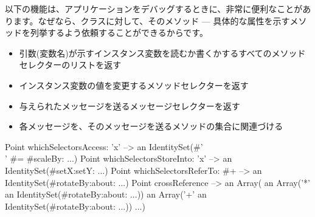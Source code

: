 \documentclass[a4paper,10pt,twoside]{book}
\begin{document}
以下の機能は、アプリケーションをデバッグするときに、非常に便利なことがあります。なぜなら、クラスに対して、そのメソッド --- 具体的な属性を示すメソッドを列挙するよう依頼することができるからです。%
\begin{itemize}
\item {} 引数(変数名)が示すインスタンス変数を読むか書くかするすべてのメソッドセレクターのリストを返す %
\item {} インスタンス変数の値を変更するメソッドセレクターを返す
\item {} 与えられたメッセージを送るメッセージセレクターを返す
\item {} 各メッセージを、そのメッセージを送るメソッドの集合に関連づける %
\end{itemize}

\begin{code}{} %
Point whichSelectorsAccess: 'x'    --> an IdentitySet(#'\\' #= #scaleBy: ...)
Point whichSelectorsStoreInto: 'x' --> an IdentitySet(#setX:setY: ...)
Point whichSelectorsReferTo: #+  --> an IdentitySet(#rotateBy:about: ...)
Point crossReference --> an Array(
		an Array('*' an IdentitySet(#rotateBy:about: ...))
		an Array('+' an IdentitySet(#rotateBy:about: ...))
		...)
\end{code}
\end{document}

